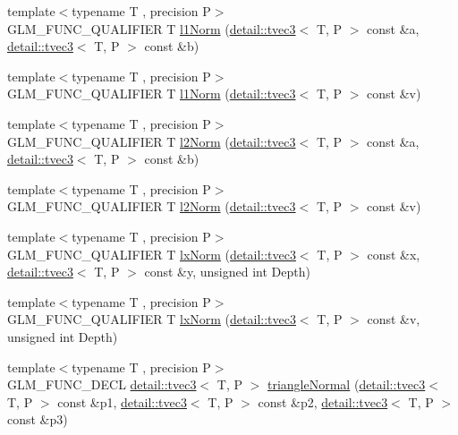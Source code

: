 \begin{DoxyCompactItemize}
\item 
{\footnotesize template$<$typename T , precision P$>$ }\\G\-L\-M\-\_\-\-F\-U\-N\-C\-\_\-\-Q\-U\-A\-L\-I\-F\-I\-E\-R T \hyperlink{group__gtx__norm_gae7c48d18df3e4a9c13bb9c003e434d5f}{l1\-Norm} (\hyperlink{structglm_1_1detail_1_1tvec3}{detail\-::tvec3}$<$ T, P $>$ const \&a, \hyperlink{structglm_1_1detail_1_1tvec3}{detail\-::tvec3}$<$ T, P $>$ const \&b)
\item 
{\footnotesize template$<$typename T , precision P$>$ }\\G\-L\-M\-\_\-\-F\-U\-N\-C\-\_\-\-Q\-U\-A\-L\-I\-F\-I\-E\-R T \hyperlink{group__gtx__norm_ga466d01e7b4350f44250d80ec48128fbd}{l1\-Norm} (\hyperlink{structglm_1_1detail_1_1tvec3}{detail\-::tvec3}$<$ T, P $>$ const \&v)
\item 
{\footnotesize template$<$typename T , precision P$>$ }\\G\-L\-M\-\_\-\-F\-U\-N\-C\-\_\-\-Q\-U\-A\-L\-I\-F\-I\-E\-R T \hyperlink{group__gtx__norm_ga46af6669c4e8b042e284dd3b6c0caf28}{l2\-Norm} (\hyperlink{structglm_1_1detail_1_1tvec3}{detail\-::tvec3}$<$ T, P $>$ const \&a, \hyperlink{structglm_1_1detail_1_1tvec3}{detail\-::tvec3}$<$ T, P $>$ const \&b)
\item 
{\footnotesize template$<$typename T , precision P$>$ }\\G\-L\-M\-\_\-\-F\-U\-N\-C\-\_\-\-Q\-U\-A\-L\-I\-F\-I\-E\-R T \hyperlink{group__gtx__norm_gacdfd8d645b91db95a191a1294226571b}{l2\-Norm} (\hyperlink{structglm_1_1detail_1_1tvec3}{detail\-::tvec3}$<$ T, P $>$ const \&v)
\item 
{\footnotesize template$<$typename T , precision P$>$ }\\G\-L\-M\-\_\-\-F\-U\-N\-C\-\_\-\-Q\-U\-A\-L\-I\-F\-I\-E\-R T \hyperlink{group__gtx__norm_gaf2ec2a2b14e0d4ddfadd5b1a98ed9799}{lx\-Norm} (\hyperlink{structglm_1_1detail_1_1tvec3}{detail\-::tvec3}$<$ T, P $>$ const \&x, \hyperlink{structglm_1_1detail_1_1tvec3}{detail\-::tvec3}$<$ T, P $>$ const \&y, unsigned int Depth)
\item 
{\footnotesize template$<$typename T , precision P$>$ }\\G\-L\-M\-\_\-\-F\-U\-N\-C\-\_\-\-Q\-U\-A\-L\-I\-F\-I\-E\-R T \hyperlink{group__gtx__norm_ga7f76252fa0266db34865dba8a8c0f7d6}{lx\-Norm} (\hyperlink{structglm_1_1detail_1_1tvec3}{detail\-::tvec3}$<$ T, P $>$ const \&v, unsigned int Depth)
\item 
{\footnotesize template$<$typename T , precision P$>$ }\\G\-L\-M\-\_\-\-F\-U\-N\-C\-\_\-\-D\-E\-C\-L \hyperlink{structglm_1_1detail_1_1tvec3}{detail\-::tvec3}$<$ T, P $>$ \hyperlink{group__gtx__normal_gadd95b70793270eaeec13e2e8788b71d2}{triangle\-Normal} (\hyperlink{structglm_1_1detail_1_1tvec3}{detail\-::tvec3}$<$ T, P $>$ const \&p1, \hyperlink{structglm_1_1detail_1_1tvec3}{detail\-::tvec3}$<$ T, P $>$ const \&p2, \hyperlink{structglm_1_1detail_1_1tvec3}{detail\-::tvec3}$<$ T, P $>$ const \&p3)

\end{DoxyCompactItemize}
